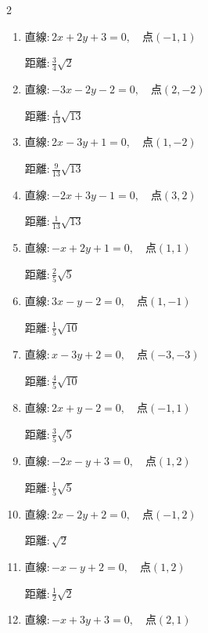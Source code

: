 \begin{multicols}{2}
\begin{enumerate}
        $\displaystyle 距離 : \frac{3}{2}\sqrt{2}$

  \item $直線:2x+2y+3=0,\quad 点 ( -1, 1 )$

        $\displaystyle 距離 : \frac{3}{4}\sqrt{2}$

  \item $直線:-3x-2y-2=0,\quad 点 ( 2, -2 )$

        $\displaystyle 距離 : \frac{4}{13}\sqrt{13}$

  \item $直線:2x-3y+1=0,\quad 点 ( 1, -2 )$

        $\displaystyle 距離 : \frac{9}{13}\sqrt{13}$

  \item $直線:-2x+3y-1=0,\quad 点 ( 3, 2 )$

        $\displaystyle 距離 : \frac{1}{13}\sqrt{13}$

  \item $直線:-x+2y+1=0,\quad 点 ( 1, 1 )$

        $\displaystyle 距離 : \frac{2}{5}\sqrt{5}$

  \item $直線:3x-y-2=0,\quad 点 ( 1, -1 )$

        $\displaystyle 距離 : \frac{1}{5}\sqrt{10}$

\columnbreak %

  \item $直線:x-3y+2=0,\quad 点 ( -3, -3 )$

        $\displaystyle 距離 : \frac{4}{5}\sqrt{10}$

  \item $直線:2x+y-2=0,\quad 点 ( -1, 1 )$

        $\displaystyle 距離 : \frac{3}{5}\sqrt{5}$

  \item $直線:-2x-y+3=0,\quad 点 ( 1, 2 )$

        $\displaystyle 距離 : \frac{1}{5}\sqrt{5}$

  \item $直線:2x-2y+2=0,\quad 点 ( -1, 2 )$

        $\displaystyle 距離 : \sqrt{2}$

  \item $直線:-x-y+2=0,\quad 点 ( 1, 2 )$

        $\displaystyle 距離 : \frac{1}{2}\sqrt{2}$

  \item $直線:-x+3y+3=0,\quad 点 ( 2, 1 )$


\end{enumerate}
\end{multicols}
